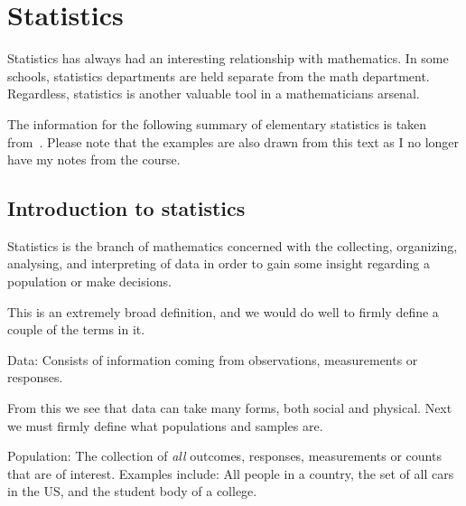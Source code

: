 \section{Statistics} %

Statistics has always had an interesting relationship with mathematics. In some schools, statistics departments are held separate from the math department. Regardless, statistics is another valuable tool in a mathematicians arsenal.\newline

The information for the following summary of elementary statistics is taken from~\cite{Stats}. Please note that the examples are also drawn from this text as I no longer have my notes from the course.

\subsection{Introduction to statistics}

Statistics is the branch of mathematics concerned with the collecting, organizing, analysing, and interpreting of data in order to gain some insight regarding a population or make decisions.\newline

 This is an extremely broad definition, and we would do well to firmly define a couple of the terms in it.

\begin{definition} 
Data: Consists of information coming from observations, measurements or responses.
\end{definition} 

From this we see that data can take many forms, both social and physical. Next we must firmly define what populations and samples are.

\begin{definition} 
Population: The collection of \emph{all} outcomes, responses, measurements or counts that are of interest. Examples include: All people in a country, the set of all cars in the US, and the student body of a college.
\end{definition} 

